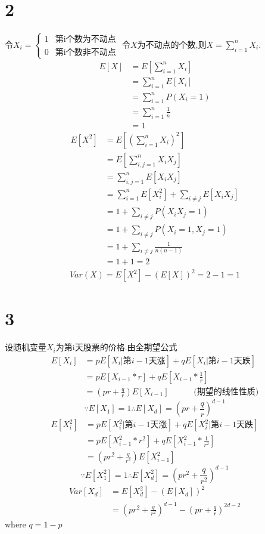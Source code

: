 \documentclass[a4paper,twocolumn]{ctexart}
\begin{document}
\section*{2}
令$X_i=
\begin{cases}
1 &\text{第i个数为不动点}\\
0 &\text{第i个数非不动点}
\end{cases}
$
令$X$为不动点的个数,则$X=\sum_{i=1}^{n}X_i$.\\
\begin{align*}
E[X]&=E[\sum_{i=1}^{n}X_i]\\
&=\sum_{i=1}^{n}E[X_i]\\
&=\sum_{i=1}^{n}P(X_i=1)\\
&=\sum_{i=1}^{n}\frac{1}{n}\\
&=1
\end{align*}
\begin{align*}
E[X^2]&=E[(\sum_{i=1}^{n}X_i)^2]\\
&=E[\sum_{i,j=1}^{n}X_iX_j]\\
&=\sum_{i,j=1}^{n}E[X_iX_j]\\
&=\sum_{i=1}^{n}E[X_i^2]+\sum_{i\neq j}E[X_iX_j]\\
&=1+\sum_{i\neq j}P(X_iX_j=1)\\
&=1+\sum_{i\neq j}P(X_i=1,X_j=1)\\
&=1+\sum_{i\neq j}\frac{1}{n(n-1)}\\
&=1+1=2
\end{align*}
\begin{align*}
Var(X)=E[X^2]-(E[X])^2=2-1=1
\end{align*}
\section*{3}
设随机变量$X_i$为第i天股票的价格.由全期望公式
\begin{align*}
E[X_i]&=pE[X_i|\text{第$i-1$天涨}]+qE[X_i|\text{第$i-1$天跌}]\\
&=pE[X_{i-1}*r]+qE[X_{i-1}*\frac{1}{r}]\\
&=(pr+\frac{q}{r})E[X_{i-1}] \text{~~~~~~~~~(期望的线性性质)}
\end{align*}
\[
\because E[X_1]=1
\therefore
E[X_d]=(pr+\frac{q}{r})^{d-1}
\]
\begin{align*}
E[X_i^2]&=pE[X_i^2|\text{第$i-1$天涨}]+qE[X_i^2|\text{第$i-1$天跌}]\\
&=pE[X_{i-1}^2*r^2]+qE[X_{i-1}^2*\frac{1}{r^2}]\\
&=(pr^2+\frac{q}{r^2})E[X_{i-1}^2]
\end{align*}
\[
\because E[X_1^2]=1
\therefore
E[X_d^2]=(pr^2+\frac{q}{r^2})^{d-1}
\]
\begin{align*}
Var[X_d]&=E[X_d^2]-(E[X_d])^2\\
&=(pr^2+\frac{q}{r^2})^{d-1}-(pr+\frac{q}{r})^{2d-2}
\end{align*}
where $q=1-p$
\end{document}
